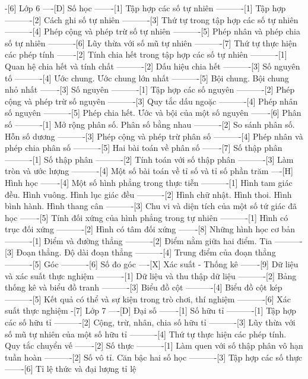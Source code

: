 -[6] Lớp 6
----[D] Số học
-------[1] Tập hợp các số tự nhiên
----------[1] Tập hợp
----------[2] Cách ghi số tự nhiên
----------[3] Thứ tự trong tập hợp các số tự nhiên
----------[4] Phép cộng và phép trừ số tự nhiên
----------[5] Phép nhân và phép chia số tự nhiên
----------[6] Lũy thừa với số mũ tự nhiên
----------[7] Thứ tự thực hiện các phép tính
-------[2] Tính chia hết trong tập hợp các số tự nhiên
----------[1] Quan hệ chia hết và tính chất
----------[2] Dấu hiệu chia hết
----------[3] Số nguyên tố
----------[4] Ước chung. Ước chung lớn nhất
----------[5] Bội chung. Bội chung nhỏ nhất
-------[3] Số nguyên
----------[1] Tập hợp các số nguyên
----------[2] Phép cộng và phép trừ số nguyên
----------[3] Quy tắc dấu ngoặc
----------[4] Phép nhân số nguyên
----------[5] Phép chia hết. Ước và bội của một số nguyên
-------[6] Phân số
----------[1] Mở rộng phân số. Phân số bằng nhau
----------[2] So sánh phân số. Hỗn số dương
----------[3] Phép cộng và phép trừ phân số
----------[4] Phép nhân và phép chia phân số
----------[5] Hai bài toán về phân số
-------[7] Số thập phân
----------[1] Số thập phân
----------[2] Tính toán với số thập phân
----------[3] Làm tròn và ước lượng
----------[4] Một số bài toán về tỉ số và tỉ số phần trăm
----[H] Hình học
-------[4] Một số hình phẳng trong thực tiễn
----------[1] Hình tam giác đều. Hình vuông. Hình lục giác đều
----------[2] Hình chữ nhật. Hình thoi. Hình bình hành. Hình thang cân
----------[3] Chu vi và diện tích của một số tứ giác đã học
-------[5] Tính đối xứng của hình phẳng trong tự nhiên
----------[1] Hình có trục đối xứng
----------[2] Hình có tâm đối xứng
-------[8] Những hình học cơ bản
----------[1] Điểm và đường thẳng
----------[2] Điểm nằm giữa hai điểm. Tia
----------[3] Đoạn thẳng. Độ dài đoạn thẳng
----------[4] Trung điểm của đoạn thẳng
----------[5] Góc
----------[6] Số đo góc
----[X] Xác suất - Thống kê
-------[9] Dữ liệu và xác suất thực nghiệm
----------[1] Dữ liệu và thu thập dữ liệu
----------[2] Bảng thống kê và biểu đồ tranh
----------[3] Biểu đồ cột
----------[4] Biểu đồ cột kép
----------[5] Kết quả có thể và sự kiện trong trò chơi, thí nghiệm
----------[6] Xác suất thực nghiệm
-[7] Lớp 7
----[D] Đại số
-------[1] Số hữu tỉ
----------[1] Tập hợp các số hữu tỉ
----------[2] Cộng, trừ, nhân, chia số hữu tỉ
----------[3] Lũy thừa với số mũ tự nhiên của một số hữu tỉ
----------[4] Thứ tự thực hiện các phép tính. Quy tắc chuyển vế
-------[2] Số thực
----------[1] Làm quen với số thập phân vô hạn tuần hoàn
----------[2] Số vô tỉ. Căn bậc hai số học
----------[3] Tập hợp các số thực
-------[6] Tỉ lệ thức và đại lượng tỉ lệ
